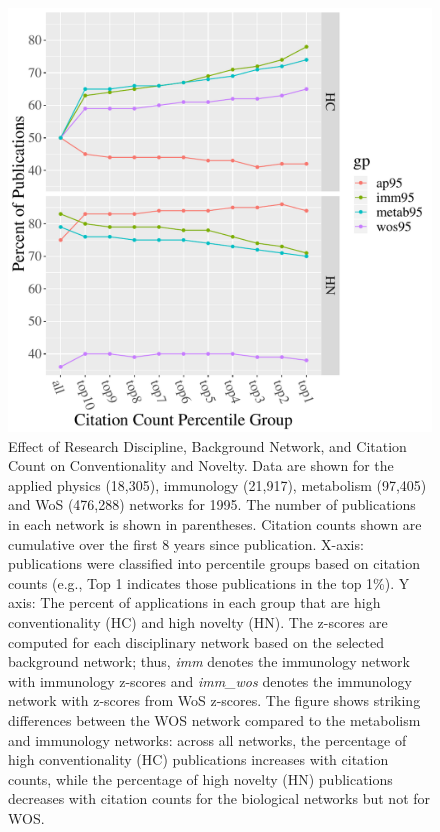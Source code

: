 \documentclass[NETN]{stjour}
\begin{document}
\begin{figure}
\includegraphics[width=\hsize]{pnas_fig1a}
\caption{Effect of Research Discipline,  Background Network,  and Citation Count on Conventionality and Novelty.
Data are shown for the applied physics (18,305), immunology (21,917), metabolism (97,405) and WoS (476,288) networks for 1995. The number of publications in each network is shown in parentheses. Citation counts shown are cumulative over the first 8 years since publication. 
X-axis: publications were classified into percentile groups based on citation counts (e.g., Top 1 indicates those publications in the top 1\%). Y axis: The percent of applications in each group that are high conventionality (HC) and high novelty (HN). The z-scores are computed for each disciplinary network based on the selected background network; thus, \emph{imm} denotes the immunology network with immunology z-scores and \emph{imm\_wos} denotes the immunology network with z-scores from WoS z-scores. The figure shows striking differences between the WOS network compared to the metabolism and immunology networks: across all networks, the percentage of high conventionality (HC) publications increases with citation counts, while the percentage of high novelty (HN) publications decreases with citation counts for the biological networks but not for WOS.
\label{fig:Fig1}}
\end{figure}
\end{document}
